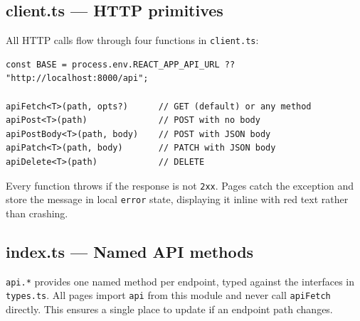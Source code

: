 \documentclass[12pt, a4paper]{article}
\begin{document}
\subsection{client.ts — HTTP primitives}

All HTTP calls flow through four functions in \texttt{client.ts}:

\begin{Verbatim}[fontsize=\small]
const BASE = process.env.REACT_APP_API_URL ?? "http://localhost:8000/api";

apiFetch<T>(path, opts?)      // GET (default) or any method
apiPost<T>(path)              // POST with no body
apiPostBody<T>(path, body)    // POST with JSON body
apiPatch<T>(path, body)       // PATCH with JSON body
apiDelete<T>(path)            // DELETE
\end{Verbatim}

Every function throws if the response is not \texttt{2xx}. Pages catch the
exception and store the message in local \texttt{error} state, displaying it
inline with red text rather than crashing.

\subsection{index.ts — Named API methods}

\texttt{api.*} provides one named method per endpoint, typed against the
interfaces in \texttt{types.ts}. All pages import \texttt{api} from this
module and never call \texttt{apiFetch} directly. This ensures a single
place to update if an endpoint path changes.
\end{document}
